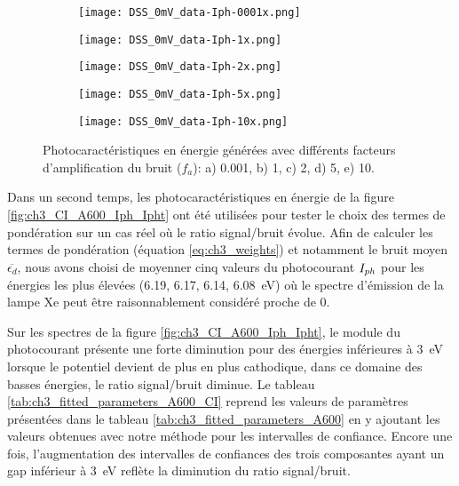 \begin{refsection}
     \begin{figure}[H]
        \centering
        \begin{subfigure}[b]{0.48\textwidth}
            \texttt{[image: DSS\_0mV\_data-Iph-0001x.png]}
            \caption{}
            \label{}
        \end{subfigure}
        \begin{subfigure}[b]{0.48\textwidth}
            \texttt{[image: DSS\_0mV\_data-Iph-1x.png]}
            \caption{}
            \label{}
        \end{subfigure}
        \begin{subfigure}[b]{0.48\textwidth}
            \texttt{[image: DSS\_0mV\_data-Iph-2x.png]}
            \caption{}
            \label{}
        \end{subfigure}
    \end{figure}
    \begin{figure}[H]
        \ContinuedFloat
        \begin{subfigure}[b]{0.48\textwidth}
            \texttt{[image: DSS\_0mV\_data-Iph-5x.png]}
            \caption{}
            \label{}
        \end{subfigure}
        \begin{subfigure}[b]{0.48\textwidth}
            \texttt{[image: DSS\_0mV\_data-Iph-10x.png]}
            \caption{}
            \label{}
        \end{subfigure}
        \caption{Photocaractéristiques en énergie générées avec différents facteurs d'amplification du bruit ($f_a$): 
        a) 0.001,
        b) 1,
        c) 2,
        d) 5,
        e) 10.}
        \label{fig:ch3_noise_test}
    \end{figure}

   
    Dans un second temps, les photocaractéristiques en énergie de la figure \ref{fig:ch3_CI_A600_Iph_Ipht} ont été
    utilisées pour tester
    le choix des termes de pondération sur un cas réel où le ratio signal/bruit évolue. Afin de calculer les termes de
    pondération (équation \ref{eq:ch3_weights}) et notamment le bruit moyen $\overline{\epsilon_d}$,
    nous avons choisi de moyenner cinq valeurs du photocourant $I_{ph}$ pour
    les énergies les plus élevées (6.19, 6.17, 6.14, 6.08~eV) où le spectre d'émission de la lampe Xe peut être
    raisonnablement considéré proche de 0. 

    Sur les spectres de la figure \ref{fig:ch3_CI_A600_Iph_Ipht}, 
    le module du photocourant présente une forte 
    diminution pour des énergies inférieures à \SI{3}{\electronvolt} lorsque le potentiel devient de plus en plus
    cathodique, dans ce domaine des basses énergies, le ratio signal/bruit diminue. 
    Le tableau \ref{tab:ch3_fitted_parameters_A600_CI} reprend les valeurs de paramètres présentées dans le tableau
    \ref{tab:ch3_fitted_parameters_A600} en y ajoutant les valeurs obtenues avec notre méthode pour les intervalles de confiance.
    Encore une fois, l'augmentation des intervalles de confiances des trois composantes ayant un gap inférieur à 
    \SI{3}{\electronvolt} reflète la diminution du ratio signal/bruit.
    

\end{refsection}
